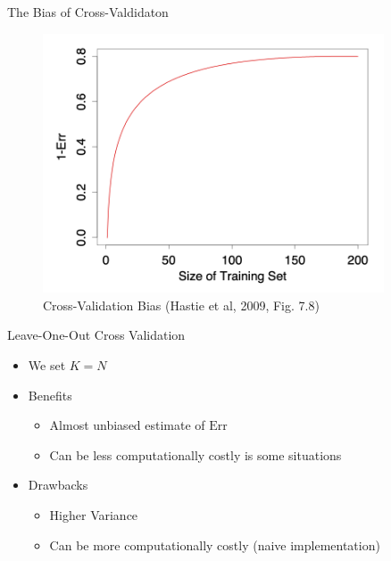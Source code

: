 \documentclass[10pt,handout]{beamer}
\begin{document}
\begin{frame}{The Bias of Cross-Valdidaton}

\begin{figure}[h]
\caption{Cross-Validation Bias (Hastie et al, 2009, Fig. 7.8)}
\centering
\includegraphics[width=0.9\textwidth]{figs/ESL_7_8.png}
\end{figure}

\end{frame}


\begin{frame}{Leave-One-Out Cross Validation}

\begin{itemize}
\item We set $K=N$
\item Benefits
\begin{itemize}
\item Almost unbiased estimate of $\text{Err}$
\item Can be less computationally costly is some situations
\end{itemize}
\item Drawbacks
\begin{itemize}
\item Higher Variance
\item Can be more computationally costly (naive implementation)
\end{itemize}
\end{itemize}

\end{frame}
\end{document}
